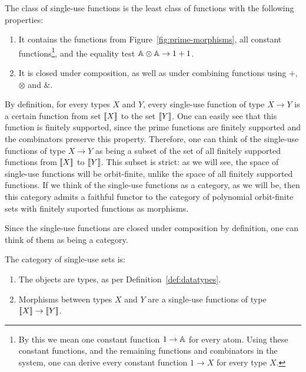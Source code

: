    


\begin{definition} The class of single-use functions is the least class of functions with the following properties:
        \begin{enumerate}
            \item It contains the functions from Figure~\ref{fig:prime-morphisms}, all constant functions\footnote{By this we mean one constant function $1 \to \mathbb A$ for every atom. Using these constant functions, and the remaining functions and combinators in the system, one can derive every constant function $1 \to X$ for every type $X$.}, and the equality test $\mathbb A \otimes \mathbb A \to 1+1$.
            \item It is closed under composition, as well as under combining functions using  $+$, $\otimes$ and $\&$. 
        \end{enumerate}
\end{definition}

By definition, for every types $X$ and $Y$, every single-use function of type $X \to Y$ is a certain function from set $[{\kern-0.4ex}[X]{\kern-0.4ex}]$ to the set $[{\kern-0.4ex}[Y]{\kern-0.4ex}]$. One can easily see that this function is  finitely supported, since the prime functions are finitely supported and the combinators preserve this property.  Therefore, one can think of the single-use functions of type $X \to Y$ as being a subset of the set of all finitely supported functions from $[{\kern-0.4ex}[X]{\kern-0.4ex}]$ to $[{\kern-0.4ex}[Y]{\kern-0.4ex}]$. This subset is strict: as we will see, the space of single-use functions will be orbit-finite, unlike the space of all finitely supported functions. If we think of the single-use functions as a category, as we will be, then this category admits a faithful functor to the category of polynomial orbit-finite sets with finitely suported functions as morphisms.





Since the single-use functions are closed under composition by definition, one can think of them as being a category. 


\begin{definition}\label{def:single-use-category}
    The category of single-use sets is:
    \begin{enumerate}
        \item The objects are types, as per Definition~\ref{def:datatypes}.
        \item Morphisms between types $X$ and $Y$ are a single-use functions of type $[{\kern-0.4ex}[X]{\kern-0.4ex}] \to [{\kern-0.4ex}[Y]{\kern-0.4ex}]$.
    \end{enumerate}
\end{definition}

